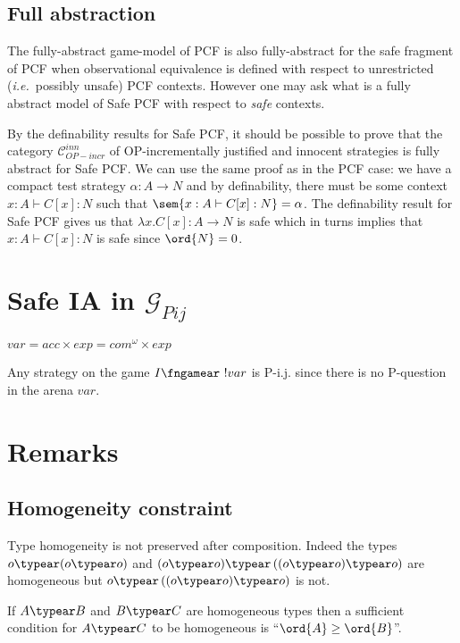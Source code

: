 \subsection{Full abstraction}

The fully-abstract game-model of PCF is also fully-abstract for the
safe fragment of PCF when observational equivalence is defined with
respect to unrestricted ({\it i.e.}~possibly unsafe) PCF contexts.
However one may ask what is a fully abstract model of Safe PCF with
respect to \emph{safe} contexts.


\hrulefill

By the definability results for Safe PCF, it should be possible to
prove that the category $\mathcal{C}^{inn}_{OP-incr}$ of
OP-incrementally justified and innocent strategies is fully abstract
for Safe PCF. We can use the same proof as in the PCF case: we have
a compact test strategy $\alpha:A\rightarrow N$ and by definability,
there must be some context $x:A \vdash C[x] : N$ such that $\sem{x:A
\vdash C[x] : N} = \alpha$. The definability result for Safe PCF
gives us that $\lambda x . C[x] : A \rightarrow N$ is safe which in
turns implies that $x:A \vdash C[x] : N$ is safe since $\ord{N} =
0$.

\hrulefill






\section{Safe IA in $\mathcal{G}_{Pij}$}
$var = acc \times exp = com^{\omega}\times exp$

Any strategy on the game $I \fngamear\ !var$ is P-i.j. since there is no P-question in the arena $var$.


\section{Remarks}
\subsection{Homogeneity constraint}

Type homogeneity is not preserved after composition. Indeed the
types  $o \typear (o \typear o)$ and $(o \typear o) \typear \left((o
\typear o) \typear o \right)$ are homogeneous but $o \typear
\left((o \typear o) \typear o\right)$ is not.

If $A\typear B$ and $B \typear C$ are homogeneous types then  a
sufficient condition for $A\typear C$ to be homogeneous is
``$\ord{A} \geq \ord{B}$''.



